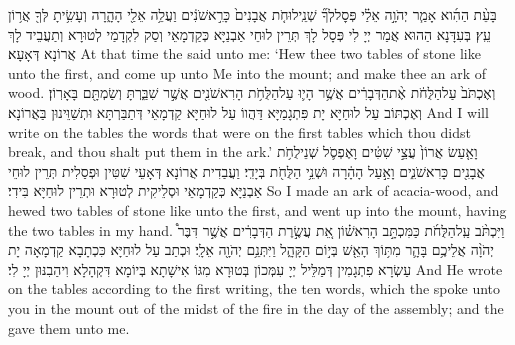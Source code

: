 \newperek
{}
{בָּעֵ֨ת הַהִ֜וא אָמַ֧ר יְהֹוָ֣ה אֵלַ֗י פְּסׇל\maqqaf לְךָ֞ שְׁנֵֽי\maqqaf לוּחֹ֤ת אֲבָנִים֙ כָּרִ֣אשֹׁנִ֔ים וַעֲלֵ֥ה אֵלַ֖י הָהָ֑רָה וְעָשִׂ֥יתָ לְּךָ֖ אֲר֥וֹן עֵֽץ׃}
{בְּעִדָּנָא הַהוּא אֲמַר יְיָ לִי פְּסָל לָךְ תְּרֵין לוּחֵי אַבְנַיָּא כְּקַדְמָאֵי וְסַק לִקְדָמַי לְטוּרָא וְתַעֲבֵיד לָךְ אֲרוֹנָא דְּאָעָא׃}
{At that time the \lord\space said unto me: ‘Hew thee two tables of stone like unto the first, and come up unto Me into the mount; and make thee an ark of wood.}{}
{וְאֶכְתֹּב֙ עַל\maqqaf הַלֻּחֹ֔ת אֶ֨ת\maqqaf הַדְּבָרִ֔ים אֲשֶׁ֥ר הָי֛וּ עַל\maqqaf הַלֻּחֹ֥ת הָרִאשֹׁנִ֖ים אֲשֶׁ֣ר שִׁבַּ֑רְתָּ וְשַׂמְתָּ֖ם בָּאָרֽוֹן׃}
{וְאֶכְתּוֹב עַל לוּחַיָּא יָת פִּתְגָמַיָּא דַּהֲווֹ עַל לוּחַיָּא קַדְמָאֵי דְּתַבַּרְתָּא וּתְשַׁוֵּינוּן בַּאֲרוֹנָא׃}
{And I will write on the tables the words that were on the first tables which thou didst break, and thou shalt put them in the ark.’}{}
{וָאַ֤עַשׂ אֲרוֹן֙ עֲצֵ֣י שִׁטִּ֔ים וָאֶפְסֹ֛ל שְׁנֵי\maqqaf לֻחֹ֥ת אֲבָנִ֖ים כָּרִאשֹׁנִ֑ים וָאַ֣עַל הָהָ֔רָה וּשְׁנֵ֥י הַלֻּחֹ֖ת בְּיָדִֽי׃}
{וַעֲבַדִית אֲרוֹנָא דְּאָעֵי שִׁטִּין וּפְסַלִית תְּרֵין לוּחֵי אַבְנַיָּא כְּקַדְמָאֵי וּסְלֵיקִית לְטוּרָא וּתְרֵין לוּחַיָּא בִּידִי׃}
{So I made an ark of acacia-wood, and hewed two tables of stone like unto the first, and went up into the mount, having the two tables in my hand.}{}
{וַיִּכְתֹּ֨ב עַֽל\maqqaf הַלֻּחֹ֜ת כַּמִּכְתָּ֣ב הָרִאשׁ֗וֹן אֵ֚ת עֲשֶׂ֣רֶת הַדְּבָרִ֔ים אֲשֶׁ֣ר דִּבֶּר֩ יְהֹוָ֨ה אֲלֵיכֶ֥ם בָּהָ֛ר מִתּ֥וֹךְ הָאֵ֖שׁ בְּי֣וֹם הַקָּהָ֑ל וַיִּתְּנֵ֥ם יְהֹוָ֖ה אֵלָֽי׃}
{וּכְתַב עַל לוּחַיָּא כִּכְתָבָא קַדְמָאָה יָת עַשְׂרָא פִתְגָמִין דְּמַלֵּיל יְיָ עִמְּכוֹן בְּטוּרָא מִגּוֹ אִישָׁתָא בְּיוֹמָא דִּקְהָלָא וִיהַבִנּוּן יְיָ לִי׃}
{And He wrote on the tables according to the first writing, the ten words, which the \lord\space spoke unto you in the mount out of the midst of the fire in the day of the assembly; and the \lord\space gave them unto me.}{}
